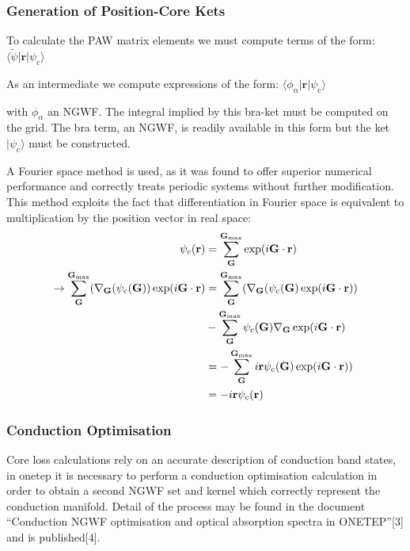 \documentclass[letterpaper,10pt,english]{sphinxmanual}
\begin{document}
\subsubsection{Generation of Position-Core Kets}
\label{\detokenize{eels_in_onetep:generation-of-position-core-kets}}
To calculate the PAW matrix elements we must compute terms of the form:
\(\langle\widetilde{\psi}|\mathbf{r}|\psi_\mathrm{c}\rangle\)

As an intermediate we compute expressions of the form:
\(\langle\phi_\alpha|\mathbf{r}|\psi_\mathrm{c}\rangle\)

with \(\phi_\alpha\) an NGWF. The integral implied by this bra-ket must be computed
on the grid. The bra term, an NGWF, is readily available in this form but the
ket \(|\psi_\mathrm{c}\rangle\) must be constructed.

A Fourier space method is used, as it was found
to offer superior numerical performance and correctly treats periodic systems
without further modification. This method exploits the fact that differentiation
in Fourier space is equivalent to multiplication by the position vector in real
space:
\begin{equation*}
\begin{split}\begin{aligned}
\psi_{\rm c}(\mathbf{r}) &= \sum\limits_\mathbf{G}^{\mathbf{G}_{\rm max}} \exp(i\mathbf{G}\cdot\mathbf{r}) \\
\rightarrow \sum\limits_\mathbf{G}^{\mathbf{G}_{\rm max}}( \nabla_\mathbf{G}(\psi_{\rm c}(\mathbf{G}))\exp(i\mathbf{G}\cdot\mathbf{r}) &= \sum\limits_\mathbf{G}^{\mathbf{G}_{\rm max}}( \nabla_\mathbf{G}(\psi_{\rm c}(\mathbf{G})\exp(i\mathbf{G}\cdot\mathbf{r})) \\
&-\sum\limits_\mathbf{G}^{\mathbf{G}_{\rm max}} \psi_{\rm c}(\mathbf{G}) \nabla_\mathbf{G} \exp(i\mathbf{G}\cdot\mathbf{r}) \\
&=-\sum\limits_\mathbf{G}^{\mathbf{G}_{\rm max}} i \mathbf{r} \psi_{\rm c}(\mathbf{G}) \exp(i\mathbf{G}\cdot\mathbf{r})) \\
&=-i\mathbf{r}  \psi_{\rm c}(\mathbf{r})
\end{aligned}\end{split}
\end{equation*}

\subsubsection{Conduction Optimisation}
\label{\detokenize{eels_in_onetep:conduction-optimisation}}
Core loss calculations rely on an accurate description of conduction band states,
in onetep it is necessary to perform a conduction optimisation calculation in
order to obtain a second NGWF set and kernel which correctly represent the
conduction manifold. Detail of the process may be found in the document
“Conduction NGWF optimisation and optical absorption spectra in ONETEP”{[}3{]}
and is published{[}4{]}.
\end{document}

